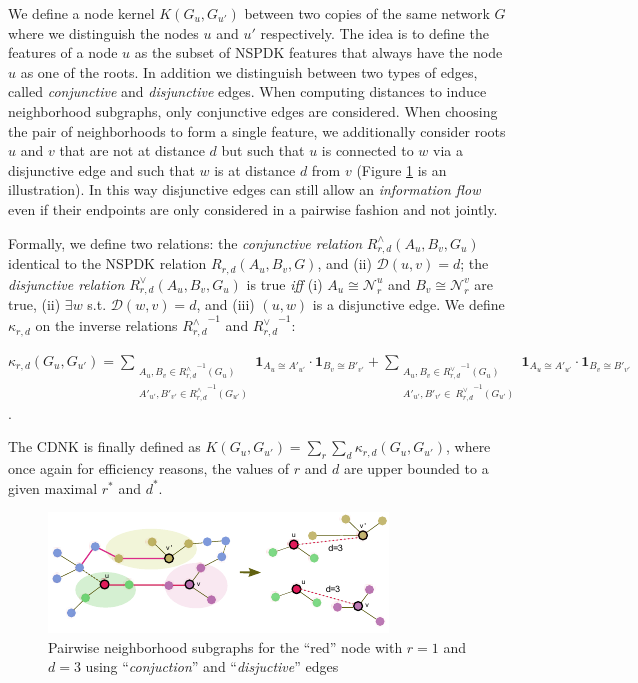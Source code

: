 \documentclass[review]{elsarticle}
\begin{document}
We define a node kernel $K(G_u,G_{u'})$ between two copies of the same network $G$ where we distinguish the nodes $u$ and $u'$ respectively. The idea is to define the features of a node $u$ as the subset of NSPDK features that always have the node $u$ as one of the roots. In addition we distinguish between two types of edges, called {\em conjunctive} and {\em disjunctive} edges. When computing distances to induce neighborhood subgraphs, only conjunctive edges are considered. When choosing the
pair of neighborhoods to form a single feature, we additionally consider roots $u$ and $v$ that are not at distance $d$ but such that $u$ is connected to $w$ via a disjunctive edge and such that $w$ is at distance $d$ from $v$ (Figure \ref{fig:cdnk} is an illustration). In this way disjunctive edges can still allow an {\em information flow} even if their
endpoints are only considered in a pairwise fashion and not jointly. 

Formally, we define two relations: the \textit{conjunctive relation} $R^{\wedge}_{r,d}(A_u, B_v, G_u)$ identical to the NSPDK relation $R_{r,d}(A_u, B_v, G)$,  and (ii) $\mathcal{D}(u,v)= d$; the \textit{disjunctive relation} $R_{r,d}^{\vee}(A_u, B_v, G_u)$ is true {\em iff} (i)  $A_u \cong \mathcal{N}_r^u$ and $B_v \cong \mathcal{N}_r^v$ are true, (ii) $\exists w$ s.t. $\mathcal{D}(w,v)= d$, and (iii) $(u,w)$ is a disjunctive edge. We define $\kappa_{r,d}$ on the  inverse relations ${R^{\wedge}_{r,d}}^{ -1}$ and ${R^{\vee}_{r,d}}^{ -1}$:
\begin{center}
 $\kappa_{r,d}(G_u,G_{u'}) = \!\!\!\!\!\!\!\!\!\!\!\!
 \sum\limits_{\substack {A_u,{B}_{v} \in {R_{r,d}^{\wedge}}^{ -1}(G_u) \\ A'_{u'},{B'}_{v'} \in {R_{r,d}^{\wedge}}^{ -1}(G_{u'}) }} \!\!\!\!\!\!\!\!\!\!\!\!
  { \textbf{1}_{A_u \cong A'_{u'}} \cdot { \textbf{1}_{B_{v} \cong B'_{v'}}}}
+ \!\!\!\!\!\!\!\!\!\!\!\!
 \sum\limits_{\substack {A_u,{B}_{v} \in {R_{r,d}^{\vee}}^{ -1}(G_u) \\
  A'_{u'},{B'}_{v'} \in \ {R_{r,d}^{\vee}}^{ -1}(G_{u'}) }} \!\!\!\!\!\!\!\!\!\!\!\!
  { \textbf{1}_{A_u \cong A'_{u'}} \cdot { \textbf{1}_{B_{v} \cong B'_{v'}}}}
  $.
\end{center}
The CDNK is finally defined as $K(G_u,G_{u'}) = \sum\limits_{r}{\sum\limits_{d}{\kappa_{r,d}(G_u,G_{u'})}}$, where once again for efficiency reasons, the values of $r$ and $d$ are upper bounded to a given maximal $r^*$ and $d^*$.

\begin{figure}
\centering
\includegraphics[width=.9\textwidth]{cdnk}
\caption{Pairwise neighborhood subgraphs for the ``red'' node with $r=1$ and $d=3$ using ``\textit{conjuction}'' and ``\textit{disjuctive}'' edges}
\label{fig:cdnk}
\end{figure}
\end{document}
